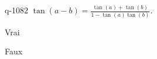 \begin{truefalse}{q-1082}
$\tan(a-b)=\frac{\tan(a) + \tan(b)}{1-\tan(a)\tan(b)}$.
\item Vrai
\item* Faux
\end{truefalse}

